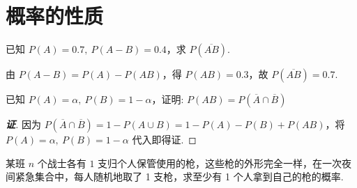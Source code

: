 \section{概率的性质}

\begin{example}
    已知 $P(A)=0.7,~P(A-B)=0.4$，求 $P(\overline{AB})$.
\end{example}
\begin{solution}
    由 $P(A-B)=P(A)-P(AB)$，得 $P(AB)=0.3$，故 $P(\overline{AB})=0.7.$
\end{solution}

\begin{example}
    已知 $P(A)=\alpha,~P(B)=1-\alpha$，证明: $P(AB)=P(\overline{A}\cap\overline{B})$
\end{example}
\begin{proof}[{\songti \textbf{证}}]
    因为 $P(\overline{A}\cap\overline{B})=1-P(A\cup B)=1-P(A)-P(B)+P(AB)$，将 $P(A)=\alpha,~P(B)=1-\alpha$ 代入即得证.
\end{proof}

\begin{example}
    某班 $n$ 个战士各有 $1$ 支归个人保管使用的枪，这些枪的外形完全一样，在一次夜间紧急集合中，每人随机地取了 1 支枪，求至少有 1 个人拿到自己的枪的概率.
\end{example}
\begin{solution}
    
\end{solution}